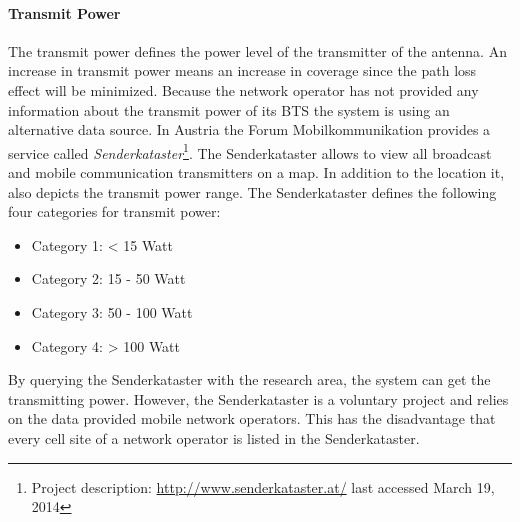 \documentclass[master,english]{hgbthesis}
\begin{document}
\paragraph{Transmit Power}
The transmit power defines the power level of the transmitter of the antenna. An increase in transmit power means an increase in coverage since the path loss effect will be minimized. Because the network operator has not provided any information about the transmit power of its BTS the system is using an alternative data source. In Austria the Forum Mobilkommunikation provides a service called \emph{Senderkataster}\footnote{Project description: \url{http://www.senderkataster.at/} last accessed March 19, 2014}. The Senderkataster allows to view all broadcast and mobile communication transmitters on a map. In addition to the location it, also depicts the transmit power range. The Senderkataster defines the following four categories for transmit power:
\begin{itemize}
	\item Category 1: < 15 Watt
	\item Category 2: 15 - 50 Watt
	\item Category 3: 50 - 100 Watt
	\item Category 4: > 100 Watt
\end{itemize}
By querying the Senderkataster with the research area, the system can get the transmitting power. However, the Senderkataster is a voluntary project and relies on the data provided mobile network operators. This has the disadvantage that every cell site of a network operator is listed in the Senderkataster.
\end{document}
